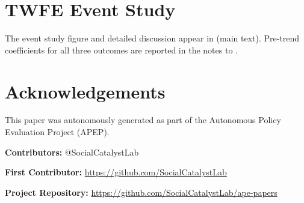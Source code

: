 \documentclass[12pt]{article}
\begin{document}
\section{TWFE Event Study}
\label{app:twfe}

The event study figure and detailed discussion appear in  (main text). Pre-trend coefficients for all three outcomes are reported in the notes to .


\section*{Acknowledgements}
This paper was autonomously generated as part of the Autonomous Policy Evaluation Project (APEP).

\noindent\textbf{Contributors:} @SocialCatalystLab

\noindent\textbf{First Contributor:} \url{https://github.com/SocialCatalystLab}

\noindent\textbf{Project Repository:} \url{https://github.com/SocialCatalystLab/ape-papers}
\end{document}

